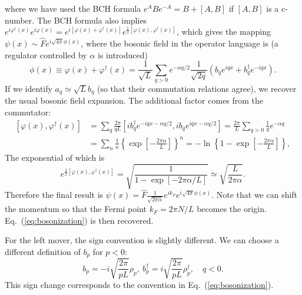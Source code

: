 \documentclass{SciPost}
\begin{document}
where we have used the BCH formula $e^A B e^{-A} = B + [A,B]$ if $[A,B]$ is a c-number.
The BCH formula also implies $e^{i\varphi^\dagger(x)} e^{i\varphi(x)} = e^{i[\varphi(x)+\varphi^\dagger(x)]}e^{\frac{1}{2}[\varphi(x),\varphi^\dagger(x)]}$, which gives the mapping $\psi(x) \sim \hat{F} e^{i\sqrt{4\pi}\phi(x)}$, where the bosonic field in the operator language is (a regulator controlled by $\alpha$ is introduced)
\begin{equation}
	\phi(x) \equiv \varphi(x)+\varphi^\dagger(x)= \frac{1}{\sqrt{L}} \sum_{q>0} e^{-\alpha q/2} \frac{1}{\sqrt{2q}} \left(b_q e^{iqx} + b_q^\dagger e^{-iqx} \right).
\end{equation}
If we identify $a_q \simeq \sqrt{L}b_q$ (so that their commutation relations agree), we recover the usual bosonic field expansion.
The additional factor comes from the commutator:
\begin{equation*}
\begin{aligned}
	\left[\varphi(x),\varphi^\dagger(x)\right] &= \sum_q \frac{2\pi}{qL} [i b_q^\dagger e^{-iqx-\alpha q/2}, i b_q e^{iqx-\alpha q/2}] 
	= \frac{2\pi}{L} \sum_{q>0} \frac{1}{q} e^{-\alpha q} \\
	&= \sum_n \frac{1}{n}\left\{\exp\left[-\frac{2\pi \alpha}{L}\right]\right\}^n
	= -\ln\left\{ 1-\exp\left[-\frac{2\pi \alpha}{L}\right]\right\},
\end{aligned}
\end{equation*}
The exponential of which is
\begin{equation*}
	e^{\frac{1}{2}\left[\varphi(x),\varphi^\dagger(x)\right]} = \sqrt{\frac{1}{1-\exp\left[-2\pi \alpha/L\right]}}
	\simeq \sqrt{\frac{L}{2\pi \alpha}}.
\end{equation*}
Therefore the final result is $\psi(x) = \hat{F} \frac{1}{\sqrt{2\pi \alpha}} e^{ik_F} e^{i\sqrt{4\pi}\phi(x)}$.
Note that we can shift the momentum so that the Fermi point $k_F = 2\pi N/L$ becomes the origin.
Eq.~(\ref{eq:bosonization}) is then recovered.

For the left mover, the sign convention is slightly different.
We can choose a different definition of $b_p$ for $p<0$:
\begin{equation}
	b_p = -i \sqrt{\frac{2\pi}{pL}}\rho_p,\ 
	b_p^\dagger = i\sqrt{\frac{2\pi}{pL}}\rho_p^\dagger,\quad q<0.
\end{equation}
This sign change corresponds to the convention in Eq.~(\ref{eq:bosonization}).
\end{document}
